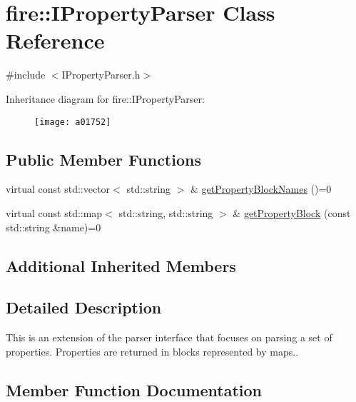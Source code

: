 \hypertarget{a01752}{}\section{fire\+:\+:I\+Property\+Parser Class Reference}
\label{a01752}


{\ttfamily \#include $<$I\+Property\+Parser.\+h$>$}

Inheritance diagram for fire\+:\+:I\+Property\+Parser\+:\begin{figure}[H]
\begin{center}
\leavevmode
\texttt{[image: a01752]}
\end{center}
\end{figure}
\subsection*{Public Member Functions}
\begin{DoxyCompactItemize}
\item 
virtual const std\+::vector$<$ std\+::string $>$ \& \hyperlink{a01752_a34602687f9d1affac7bd842102d4a6aa}{get\+Property\+Block\+Names} ()=0
\item 
virtual const std\+::map$<$ std\+::string, std\+::string $>$ \& \hyperlink{a01752_a34201371cb36dd09e96a66242ececb86}{get\+Property\+Block} (const std\+::string \&name)=0
\end{DoxyCompactItemize}
\subsection*{Additional Inherited Members}


\subsection{Detailed Description}
This is an extension of the parser interface that focuses on parsing a set of properties. Properties are returned in blocks represented by maps.. 

\subsection{Member Function Documentation}
\mbox{\label{a01752_a34201371cb36dd09e96a66242ececb86}} 
